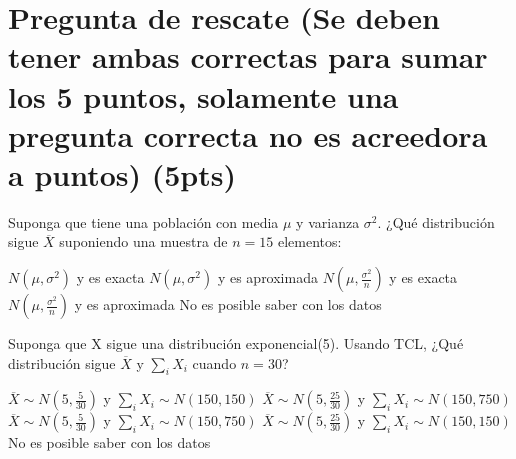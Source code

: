 \documentclass[addpoints]{exam}
\theoremstyle{mytheor}
\begin{document}
  \section*{Pregunta de rescate (Se deben tener ambas correctas para sumar los 5 puntos, solamente una pregunta correcta no es acreedora a puntos) (5pts)}
  
  \begin{questions}
  \question Suponga que tiene una población con media $\mu$ y varianza $\sigma^2$. ¿Qué distribución sigue $\overline{X}$ suponiendo una muestra de $n = 15$ elementos:

  \begin{checkboxes}
  \choice $N(\mu, \sigma^2)$ y es exacta
  \choice $N(\mu, \sigma^2)$ y es aproximada
  \choice $N(\mu, \frac{\sigma^2}{n})$ y es exacta
  \choice $N(\mu, \frac{\sigma^2}{n})$ y es aproximada
  \choice No es posible saber con los datos
  \end{checkboxes}
    
  \question Suponga que X sigue una distribución exponencial(5). Usando TCL, ¿Qué distribución sigue $\overline{X}$ y $\sum_i X_i$ cuando $n=30$?
  
  \begin{checkboxes}
  \choice $\overline{X} \sim N(5,\frac{5}{30})$ y $\sum_i X_i \sim N(150, 150)$
  \choice $\overline{X} \sim N(5,\frac{25}{30})$ y $\sum_i X_i \sim N(150, 750)$
  \choice $\overline{X} \sim N(5,\frac{5}{30})$ y $\sum_i X_i \sim N(150, 750)$
  \choice $\overline{X} \sim N(5,\frac{25}{30})$ y $\sum_i X_i \sim N(150, 150)$
  \choice No es posible saber con los datos
  \end{checkboxes}
  

  
  \end{questions}
  
  
  
  
\end{document}
